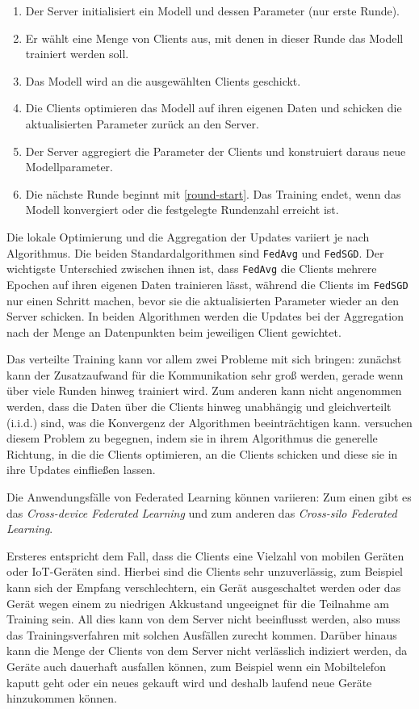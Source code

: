 \begin{enumerate}
	\item Der Server initialisiert ein Modell und dessen Parameter (nur erste Runde). 
	\item \label{round-start} Er wählt eine Menge von Clients aus, mit denen in dieser Runde das Modell trainiert werden soll.
	\item Das Modell wird an die ausgewählten Clients geschickt.
	\item Die Clients optimieren das Modell auf ihren eigenen Daten und schicken die aktualisierten Parameter zurück an den Server.
	\item Der Server aggregiert die Parameter der Clients und konstruiert daraus neue Modellparameter.
	\item Die nächste Runde beginnt mit \autoref{round-start}. Das Training endet, wenn das Modell konvergiert oder die festgelegte Rundenzahl erreicht ist.
\end{enumerate}

Die lokale Optimierung und die Aggregation der Updates variiert je nach Algorithmus. Die beiden Standardalgorithmen sind \texttt{FedAvg} und \texttt{FedSGD}\cite{mcmahan:2016}. Der wichtigste Unterschied zwischen ihnen ist, dass \texttt{FedAvg} die Clients mehrere Epochen auf ihren eigenen Daten trainieren lässt, während die Clients im \texttt{FedSGD} nur einen Schritt machen, bevor sie die aktualisierten Parameter wieder an den Server schicken. In beiden Algorithmen werden die Updates bei der Aggregation nach der Menge an Datenpunkten beim jeweiligen Client gewichtet.

Das verteilte Training kann vor allem zwei Probleme mit sich bringen: zunächst kann der Zusatzaufwand für die Kommunikation sehr groß werden, gerade wenn über viele Runden hinweg trainiert wird. Zum anderen kann nicht angenommen werden, dass die Daten über die Clients hinweg unabhängig und gleichverteilt (i.i.d.) sind, was die Konvergenz der Algorithmen beeinträchtigen kann. \textcite{karimireddy:2020} versuchen diesem Problem zu begegnen, indem sie in ihrem Algorithmus die generelle Richtung, in die die Clients optimieren, an die Clients schicken und diese sie in ihre Updates einfließen lassen.

Die Anwendungsfälle von Federated Learning können variieren: Zum einen gibt es das \textit{Cross-device Federated Learning} und zum anderen das \textit{Cross-silo Federated Learning}\cite{kairouz:2021}. 

Ersteres entspricht dem Fall, dass die Clients eine Vielzahl von mobilen Geräten oder IoT-Geräten sind. Hierbei sind die Clients sehr unzuverlässig, zum Beispiel kann sich der Empfang verschlechtern, ein Gerät ausgeschaltet werden oder das Gerät wegen einem zu niedrigen Akkustand ungeeignet für die Teilnahme am Training sein. All dies kann von dem Server nicht beeinflusst werden, also muss das Trainingsverfahren mit solchen Ausfällen zurecht kommen. Darüber hinaus kann die Menge der Clients von dem Server nicht verlässlich indiziert werden, da Geräte auch dauerhaft ausfallen können, zum Beispiel wenn ein Mobiltelefon kaputt geht oder ein neues gekauft wird und deshalb laufend neue Geräte hinzukommen können.

